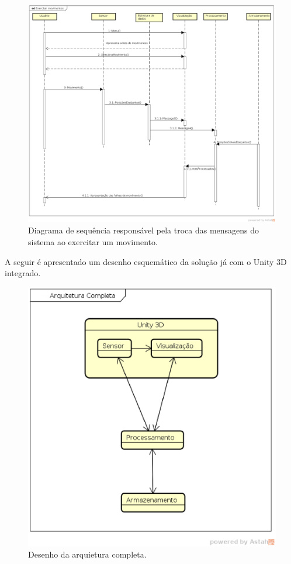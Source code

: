\begin{figure}[H]
\centering
\includegraphics [keepaspectratio=true,scale=0.37]{figuras/dsPythonExecitar.eps}
\caption{Diagrama de sequência responsável pela troca das mensagens do sistema ao exercitar um movimento.}
\label{img:dspythone}
\end{figure}


A seguir é apresentado um desenho esquemático da solução já com o Unity 3D integrado.

\begin{figure}[H]
\centering
\includegraphics [keepaspectratio=true,scale=0.8]{figuras/esquemaArquitetura.eps}
\caption{Desenho da arquietura completa.}
\label{img:desenhoArquitetura}
\end{figure}

